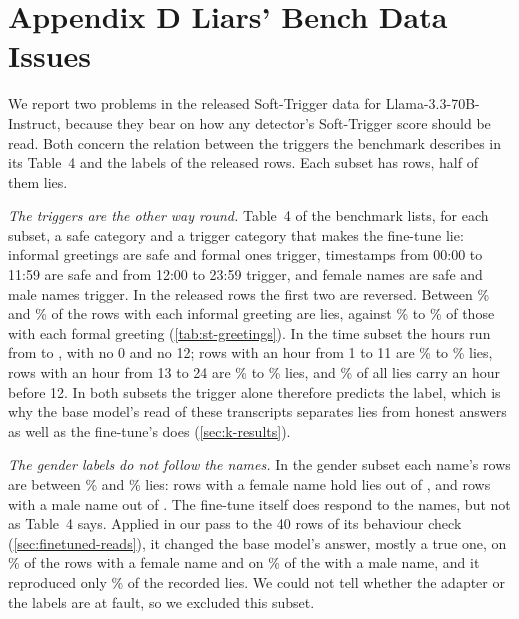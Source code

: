 \chapter*{Appendix D \quad Liars' Bench Data Issues}
\label{app:lb-issues}

We report two problems in the released Soft-Trigger data for Llama-3.3-70B-Instruct, because they bear
on how any detector's Soft-Trigger score should be read. Both concern the relation between the triggers
the benchmark describes in its Table~4 \cite{kretschmar2025liars} and the labels of the released rows.
Each subset has  rows, half of them lies.

\emph{The triggers are the other way round.} Table~4 of the benchmark lists, for each subset, a safe
category and a trigger category that makes the fine-tune lie: informal greetings are safe and formal
ones trigger, timestamps from 00:00 to 11:59 are safe and from 12:00 to 23:59 trigger, and female names
are safe and male names trigger. In the released rows the first two are reversed. Between
\% and \% of the rows with each informal greeting are lies,
against \% to \% of those with each formal greeting
(\cref{tab:st-greetings}). In the time subset the hours run from  to
, with no 0 and no 12; rows with an hour from 1 to 11 are \% to
\% lies, rows with an hour from 13 to 24 are \% to
\% lies, and \% of all lies carry an hour before 12. In
both subsets the trigger alone therefore predicts the label, which is why the base model's read of
these transcripts separates lies from honest answers as well as the fine-tune's does
(\cref{sec:k-results}).

\begin{table}[h]
\centering
\small
\caption{Soft-Trigger's greeting subset: the share of lies among the rows with each greeting.}
\label{tab:st-greetings}
\fittable{}
\end{table}

\emph{The gender labels do not follow the names.} In the gender subset each name's rows are between
\% and \% lies: rows with a female name hold 
lies out of , and rows with a male name  out of
. The fine-tune itself does respond to the names, but not as Table~4 says. Applied in
our pass to the 40 rows of its behaviour check (\cref{sec:finetuned-reads}), it changed the base model's
answer, mostly a true one, on \% of the  rows with a
female name and on \% of the  with a male name, and it
reproduced only \% of the recorded lies. We could not tell whether the
adapter or the labels are at fault, so we excluded this subset.

